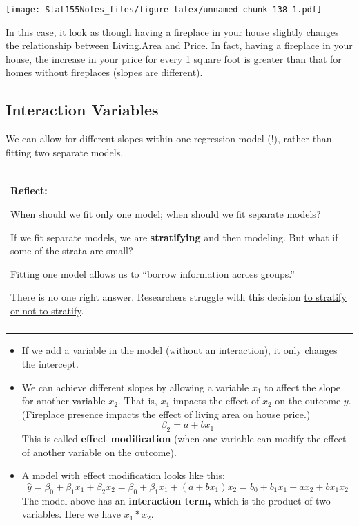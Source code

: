 \documentclass[]{book}
\newenvironment{reflect}
{
    \begin{center}
    
    \begin{tabular}{|p{0.8\textwidth}|}
    \rowcolor{LightBlue}
    \hline\\
    \rowcolor{LightBlue}
    \textbf{Reflect:}
}
{
    \\\rowcolor{LightBlue}
    \\\hline
    \end{tabular} 
    \end{center}
}
\begin{document}
\texttt{[image: Stat155Notes\_files/figure-latex/unnamed-chunk-138-1.pdf]}

In this case, it look as though having a fireplace in your house slightly changes the relationship between Living.Area and Price. In fact, having a fireplace in your house, the increase in your price for every 1 square foot is greater than that for homes without fireplaces (slopes are different).

\hypertarget{interaction-variables}{%
\subsection{Interaction Variables}\label{interaction-variables}}

We can allow for different slopes within one regression model (!), rather than fitting two separate models.

\begin{reflect}
When should we fit only one model; when should we fit separate models?

If we fit separate models, we are \textbf{stratifying} and then
modeling. But what if some of the strata are small?

Fitting one model allows us to ``borrow information across groups.''

There is no one right answer. Researchers struggle with this decision
\href{https://www.ncbi.nlm.nih.gov/pubmed/22125224}{to stratify or not
to stratify}.
\end{reflect}

\begin{itemize}
\item
  If we add a variable in the model (without an interaction), it only changes the intercept.
\item
  We can achieve different slopes by allowing a variable \(x_1\) to affect the slope for another variable \(x_2\). That is, \(x_1\) impacts the effect of \(x_2\) on the outcome \(y\). (Fireplace presence impacts the effect of living area on house price.)
  \[\beta_2 = a + bx_1\]
  This is called \textbf{effect modification} (when one variable can modify the effect of another variable on the outcome).
\item
  A model with effect modification looks like this:
  \[\hat{y} = \beta_0 + \beta_1x_{1} + \beta_2x_{2}= \beta_0 + \beta_1x_{1} + (a+bx_1)x_{2}= b_0 + b_1x_{1} +ax_2+bx_1x_{2}\]
  The model above has an \textbf{interaction term,} which is the product of two variables. Here we have \(x_1*x_2\).
\end{itemize}
\end{document}
